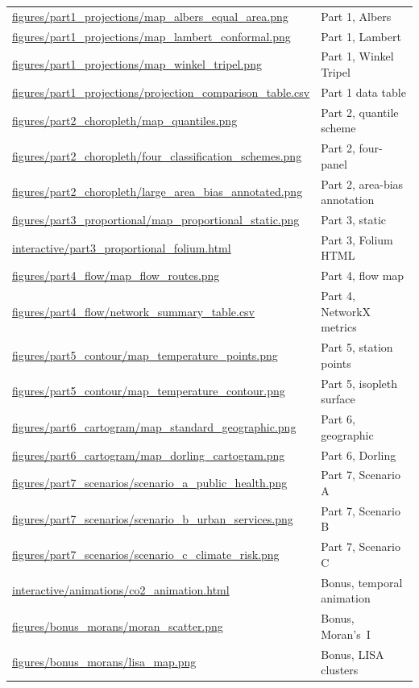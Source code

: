 \documentclass[12pt, a4paper, oneside]{report}
\begin{document}
\begin{longtable}{@{} p{7.6cm} L{6.4cm} @{}}
  \url{figures/part1_projections/map_albers_equal_area.png}  & Part 1, Albers \\
  \url{figures/part1_projections/map_lambert_conformal.png}   & Part 1, Lambert \\
  \url{figures/part1_projections/map_winkel_tripel.png}       & Part 1, Winkel Tripel \\
  \url{figures/part1_projections/projection_comparison_table.csv} & Part 1 data table \\
  \url{figures/part2_choropleth/map_quantiles.png}             & Part 2, quantile scheme \\
  \url{figures/part2_choropleth/four_classification_schemes.png} & Part 2, four-panel \\
  \url{figures/part2_choropleth/large_area_bias_annotated.png} & Part 2, area-bias annotation \\
  \url{figures/part3_proportional/map_proportional_static.png} & Part 3, static \\
  \url{interactive/part3_proportional_folium.html}             & Part 3, Folium HTML \\
  \url{figures/part4_flow/map_flow_routes.png}                & Part 4, flow map \\
  \url{figures/part4_flow/network_summary_table.csv}          & Part 4, NetworkX metrics \\
  \url{figures/part5_contour/map_temperature_points.png}      & Part 5, station points \\
  \url{figures/part5_contour/map_temperature_contour.png}     & Part 5, isopleth surface \\
  \url{figures/part6_cartogram/map_standard_geographic.png}   & Part 6, geographic \\
  \url{figures/part6_cartogram/map_dorling_cartogram.png}     & Part 6, Dorling \\
  \url{figures/part7_scenarios/scenario_a_public_health.png} & Part 7, Scenario A \\
  \url{figures/part7_scenarios/scenario_b_urban_services.png}& Part 7, Scenario B \\
  \url{figures/part7_scenarios/scenario_c_climate_risk.png}  & Part 7, Scenario C \\
  \url{interactive/animations/co2_animation.html}               & Bonus, temporal animation \\
  \url{figures/bonus_morans/moran_scatter.png}                 & Bonus, Moran's~I \\
  \url{figures/bonus_morans/lisa_map.png}                      & Bonus, LISA clusters \\
\end{longtable}
\setlength{\tabcolsep}{6pt}
\normalsize
\end{document}
